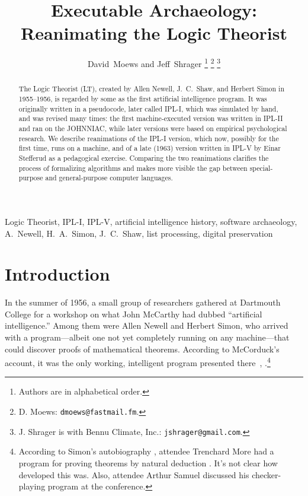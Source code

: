 \documentclass[journal]{IEEEtran}
\begin{document}
\title{Executable Archaeology: Reanimating the Logic Theorist}

\author{David~Moews and Jeff~Shrager%
\thanks{Authors are in alphabetical order.}
\thanks{D. Moews: \texttt{dmoews@fastmail.fm}.}
\thanks{J. Shrager is with Bennu Climate, Inc.:
  \texttt{jshrager@gmail.com}.}
}

\maketitle

\begin{abstract}

The Logic Theorist (LT), created by Allen Newell, J.~C.~Shaw, and
Herbert Simon in 1955--1956, is regarded by some as the first
artificial intelligence program.  It was originally written in a
pseudocode, later called IPL-I, which was simulated by hand, and
was revised many times: the first machine-executed version was
written in IPL-II and ran on the JOHNNIAC, while later versions
were based on empirical psychological research.  We describe
reanimations of the IPL-I version, which now, possibly for the first
time, runs on a machine, and of a late (1963) version written in
IPL-V by Einar Stefferud as a pedagogical exercise.  Comparing the 
two reanimations clarifies the process of formalizing algorithms and 
makes more visible the gap between special-purpose and general-purpose 
computer languages.

\end{abstract}


\begin{IEEEkeywords}
Logic Theorist, IPL-I, IPL-V, artificial intelligence history,
software archaeology, A.~Newell, H.~A.~Simon, J.~C.~Shaw, list
processing, digital preservation
\end{IEEEkeywords}

\section{Introduction}
\label{sec:intro}

In the summer of 1956, a small group of researchers gathered at
Dartmouth College for a workshop on what John McCarthy had dubbed
``artificial intelligence.'' Among them were Allen Newell and Herbert
Simon, who arrived with a program---albeit one not yet completely running on any 
machine---that could discover proofs of mathematical theorems.
According to McCorduck's account, it was the only working,
intelligent program presented there~\cite[Ch.~13]{simon1996models},
\cite[p.~123]{mccorduck2004machines}.\footnote{According to
Simon's autobiography \cite[Ch.~13]{simon1996models},
attendee Trenchard More had a program for proving theorems
by natural deduction \cite{more1956,more1957,simon1999}.
It's not clear how developed this was.
Also, attendee Arthur Samuel discussed \cite{solomonoff}
his checker-playing program at the conference.}
\end{document}
